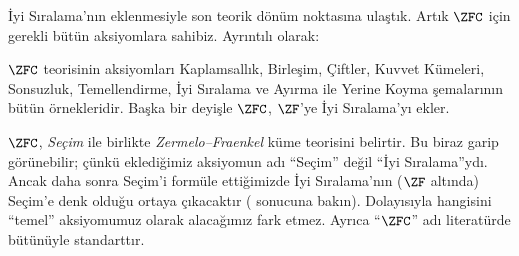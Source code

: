 


İyi Sıralama'nın eklenmesiyle son teorik dönüm noktasına ulaştık. Artık
$\ZFC$ için gerekli bütün aksiyomlara sahibiz. Ayrıntılı olarak:

\begin{defn}
$\ZFC$ teorisinin aksiyomları Kaplamsallık, Birleşim, Çiftler, Kuvvet
Kümeleri, Sonsuzluk, Temellendirme, İyi Sıralama ve Ayırma ile Yerine Koyma
şemalarının bütün örnekleridir. Başka bir deyişle $\ZFC$, $\ZF$'ye İyi
Sıralama'yı ekler.
\end{defn}

$\ZFC$, \emph{Seçim} ile birlikte \emph{Zermelo--Fraenkel} küme teorisini
belirtir. Bu biraz garip görünebilir; çünkü eklediğimiz aksiyomun adı
``Seçim'' değil ``İyi Sıralama''ydı. Ancak daha sonra Seçim'i formüle
ettiğimizde İyi Sıralama'nın ($\ZF$ altında) Seçim'e denk olduğu ortaya
çıkacaktır ( sonucuna bakın).
Dolayısıyla hangisini ``temel'' aksiyomumuz olarak alacağımız fark etmez.
Ayrıca ``$\ZFC$'' adı literatürde bütünüyle standarttır.

